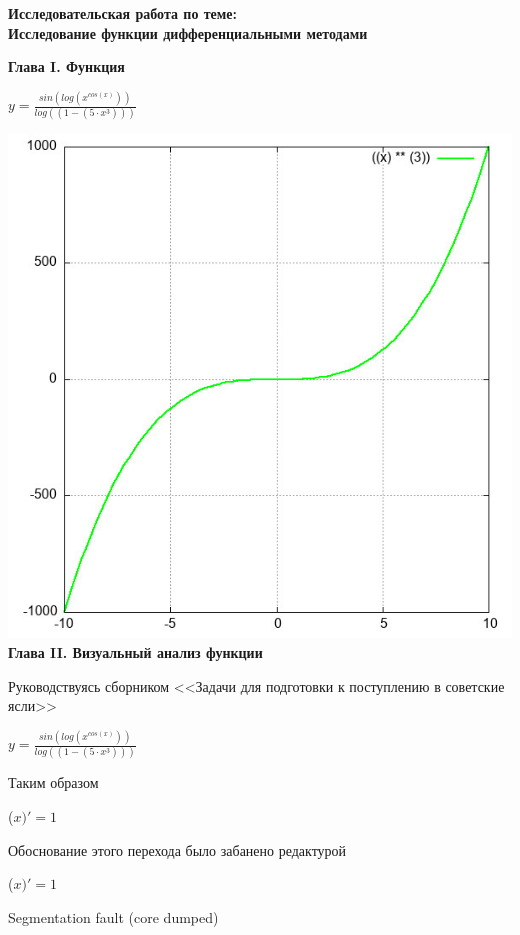 \documentclass[12pt,a4paper,fleqn]{article}
\begin{document}
\begin{center}
\textbf{\LARGE{Исследовательская работа по теме:\\Исследование функции дифференциальными методами}}\end{center}\newpage\textbf{\LARGE{Глава I. Функция}}

\begin{center}
$y = $$\frac{sin(log(x^{cos(x)}))}{log((1-(5 \cdot x^{3})))}$

\end{center}
\includegraphics{GraphicDumps/plot.jpg}\newpage \textbf{\LARGE{Глава II. Визуальный анализ функции}}

Руководствуясь сборником <<Задачи для подготовки к поступлению в советские ясли>>

\begin{center}
$y = $$\frac{sin(log(x^{cos(x)}))}{log((1-(5 \cdot x^{3})))}$

\end{center}
\newpage \textbf{}

Таким образом

\begin{center}
 ($x)'
  = 1$\end{center}
Обоснование этого перехода было забанено редактурой

\begin{center}
 ($x)'
  = 1$\end{center}
Segmentation fault (core dumped)
\end{document}
